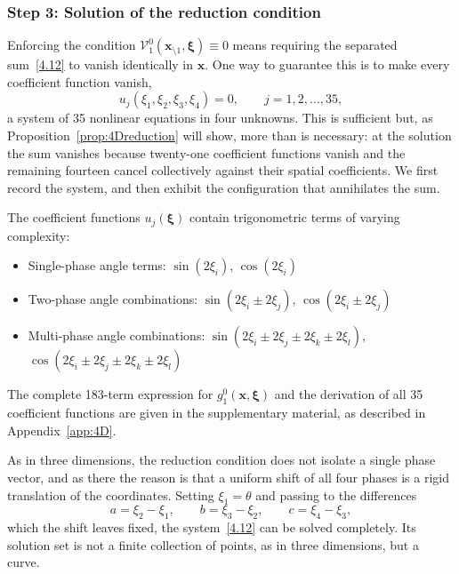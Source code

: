 \documentclass[11pt]{jfm}
\newif\iffullAppendixA
\numberwithin{equation}{section}
\begin{document}
\subsubsection{Step 3: Solution of the reduction condition}
Enforcing the condition $\mathcal{V}_1^0(\boldsymbol{x}_{\setminus 1}, \boldsymbol{\xi}) \equiv 0$
means requiring the separated sum~\eqref{4.12} to vanish identically in $\boldsymbol{x}$. One way
to guarantee this is to make every coefficient function vanish,
$$u_j(\xi_1, \xi_2, \xi_3, \xi_4) = 0, \qquad j = 1, 2, \ldots, 35,$$
a system of 35 nonlinear equations in four unknowns. This is sufficient but, as
Proposition~\ref{prop:4Dreduction} will show, more than is necessary: at the solution the sum
vanishes because twenty-one coefficient functions vanish and the remaining fourteen cancel collectively
against their spatial coefficients. We first record the system, and then exhibit the
configuration that annihilates the sum.

The coefficient functions $u_j(\boldsymbol{\xi})$ contain trigonometric terms of varying complexity:
\begin{itemize}
\item Single-phase angle terms: $\sin(2\xi_i)$, $\cos(2\xi_i)$
\item Two-phase angle combinations: $\sin(2\xi_i \pm 2\xi_j)$, $\cos(2\xi_i \pm 2\xi_j)$
\item Multi-phase angle combinations: $\sin(2\xi_i \pm 2\xi_j \pm 2\xi_k \pm 2\xi_l)$, $\cos(2\xi_i \pm 2\xi_j \pm 2\xi_k \pm 2\xi_l)$
\end{itemize}

The complete 183-term expression for $g_1^0(\boldsymbol{x}, \boldsymbol{\xi})$ and the derivation of all 35 coefficient functions are given
\iffullAppendixA in Appendix~\ref{app:4D}\else in the supplementary material, as described in
Appendix~\ref{app:4D}\fi.

As in three dimensions, the reduction condition does not isolate a single phase vector, and as
there the reason is that a uniform shift of all four phases is a rigid translation of the
coordinates. Setting $\xi_1=\theta$ and passing to the differences
\[
a=\xi_2-\xi_1,\qquad b=\xi_3-\xi_2,\qquad c=\xi_4-\xi_3,
\]
which the shift leaves fixed, the system~\eqref{4.12} can be solved completely. Its solution set is
not a finite collection of points, as in three dimensions, but a curve.
\end{document}
